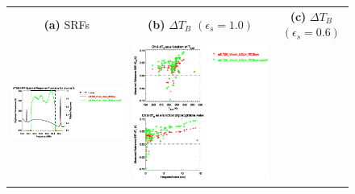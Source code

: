 \begin{figure}[H]
  \centering
  \begin{tabular}{c c c}
    \textsf{\textbf{(a)} SRFs} &
    \textsf{\textbf{(b)} $\Delta T_B$ $(\epsilon_s = 1.0)$} &
    \textsf{\textbf{(c)} $\Delta T_B$ $(\epsilon_s = 0.6)$} \\
    \includegraphics[bb=80 400 280 558,clip,scale=0.85]{graphics/srf/Rset/atms_npp.ch8.osrf.eps} &
    \includegraphics[bb=85 400 260 558,clip,scale=0.85]{graphics/dtb/Rset/e1.0_r0.0/atms_npp.ch8.dTb.eps} & 

\end{tabular}
\end{figure}
